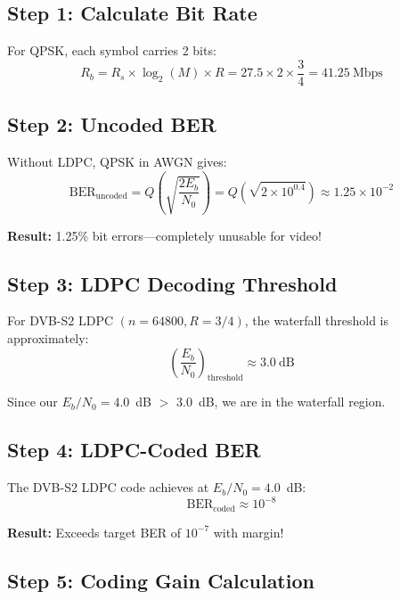 \subsection*{Step 1: Calculate Bit Rate}

For QPSK, each symbol carries 2 bits:
\begin{equation}
R_b = R_s \times \log_2(M) \times R = 27.5 \times 2 \times \frac{3}{4} = 41.25~\text{Mbps}
\end{equation}

\subsection*{Step 2: Uncoded BER}

Without LDPC, QPSK in AWGN gives:
\begin{equation}
\mathrm{BER}_{\text{uncoded}} = Q\left(\sqrt{\frac{2E_b}{N_0}}\right) = Q(\sqrt{2 \times 10^{0.4}}) \approx 1.25 \times 10^{-2}
\end{equation}

\textbf{Result:} 1.25\% bit errors---completely unusable for video!

\subsection*{Step 3: LDPC Decoding Threshold}

For DVB-S2 LDPC $(n=64800, R=3/4)$, the waterfall threshold is approximately:
\begin{equation}
\left(\frac{E_b}{N_0}\right)_{\text{threshold}} \approx 3.0~\text{dB}
\end{equation}

Since our $E_b/N_0 = 4.0$~dB $>$ 3.0~dB, we are in the waterfall region.

\subsection*{Step 4: LDPC-Coded BER}

The DVB-S2 LDPC code achieves at $E_b/N_0 = 4.0$~dB:
\begin{equation}
\mathrm{BER}_{\text{coded}} \approx 10^{-8}
\end{equation}

\textbf{Result:} Exceeds target BER of $10^{-7}$ with margin!

\subsection*{Step 5: Coding Gain Calculation}

